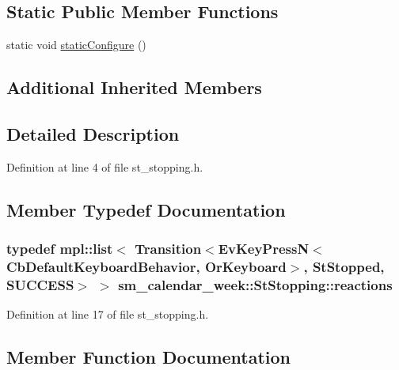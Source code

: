 \subsection*{Static Public Member Functions}
\begin{DoxyCompactItemize}
\item 
static void \hyperlink{structsm__calendar__week_1_1StStopping_ae6789d1bff1361412f985fc586cbc8a7}{static\+Configure} ()
\end{DoxyCompactItemize}
\subsection*{Additional Inherited Members}


\subsection{Detailed Description}


Definition at line 4 of file st\+\_\+stopping.\+h.



\subsection{Member Typedef Documentation}
\subsubsection[{\texorpdfstring{reactions}{reactions}}]{\setlength{\rightskip}{0pt plus 5cm}typedef mpl\+::list$<$ Transition$<$Ev\+Key\+PressN$<$Cb\+Default\+Keyboard\+Behavior, {\bf Or\+Keyboard}$>$, {\bf St\+Stopped}, {\bf S\+U\+C\+C\+E\+SS}$>$ $>$ {\bf sm\+\_\+calendar\+\_\+week\+::\+St\+Stopping\+::reactions}}\hypertarget{structsm__calendar__week_1_1StStopping_a31b3ab71de004a3a6e9c3aef8b4363c7}{}\label{structsm__calendar__week_1_1StStopping_a31b3ab71de004a3a6e9c3aef8b4363c7}


Definition at line 17 of file st\+\_\+stopping.\+h.



\subsection{Member Function Documentation}
